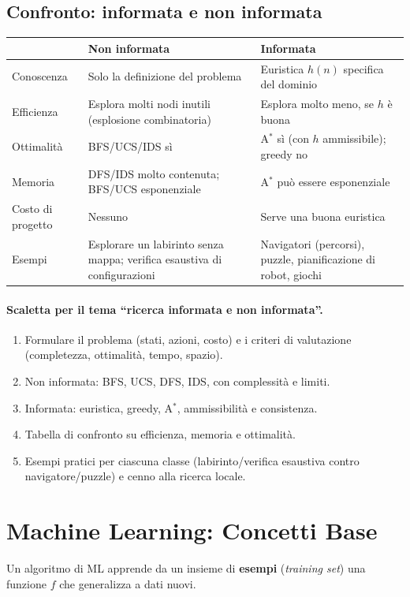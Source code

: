 \subsection{Confronto: informata e non informata}
\begin{center}
\begin{tabularx}{\textwidth}{@{}lXX@{}}
\toprule
 & \textbf{Non informata} & \textbf{Informata} \\
\midrule
Conoscenza & Solo la definizione del problema & Euristica $h(n)$ specifica del dominio \\
Efficienza & Esplora molti nodi inutili (esplosione combinatoria) & Esplora molto meno, se $h$ è buona \\
Ottimalità & BFS/UCS/IDS sì & A$^*$ sì (con $h$ ammissibile); greedy no \\
Memoria & DFS/IDS molto contenuta; BFS/UCS esponenziale & A$^*$ può essere esponenziale \\
Costo di progetto & Nessuno & Serve una buona euristica \\
Esempi & Esplorare un labirinto senza mappa; verifica esaustiva di configurazioni & Navigatori (percorsi), puzzle, pianificazione di robot, giochi \\
\bottomrule
\end{tabularx}
\end{center}

\paragraph{Scaletta per il tema ``ricerca informata e non informata''.}
\begin{enumerate}
    \item Formulare il problema (stati, azioni, costo) e i criteri di valutazione (completezza, ottimalità, tempo, spazio).
    \item Non informata: BFS, UCS, DFS, IDS, con complessità e limiti.
    \item Informata: euristica, greedy, A$^*$, ammissibilità e consistenza.
    \item Tabella di confronto su efficienza, memoria e ottimalità.
    \item Esempi pratici per ciascuna classe (labirinto/verifica esaustiva contro navigatore/puzzle) e cenno alla ricerca locale.
\end{enumerate}

\section{Machine Learning: Concetti Base}
Un algoritmo di ML apprende da un insieme di \textbf{esempi} (\emph{training set}) una funzione $f$ che generalizza a dati nuovi.

